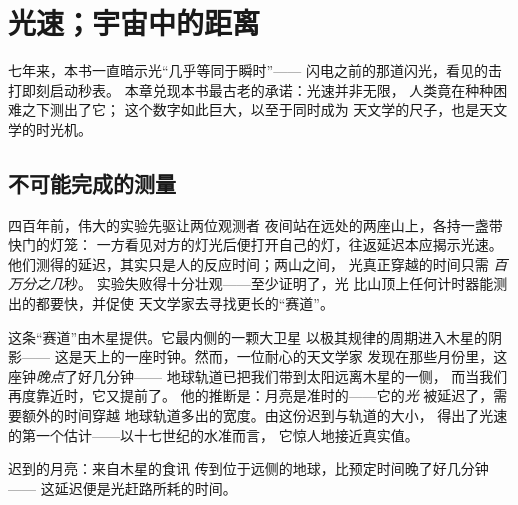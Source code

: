 \chapter{光速；宇宙中的距离}\label{ch:g8:speed-of-light}

七年来，本书一直暗示光“几乎等同于瞬时”——
闪电之前的那道闪光，看见的击打即刻启动秒表。
本章兑现本书最古老的承诺：光速并非无限，
人类竟在种种困难之下测出了它；
这个数字如此巨大，以至于同时成为
天文学的尺子，也是天文学的时光机。

\section{不可能完成的测量}

\begin{example}[两座山上的灯笼]\label{ex:g8:speed-of-light:galileo}
四百年前，伟大的实验先驱让两位观测者
夜间站在远处的两座山上，各持一盏带快门的灯笼：
一方看见对方的灯光后便打开自己的灯，往返延迟本应揭示光速。
他们测得的延迟，其实只是人的反应时间；两山之间，
光真正穿越的时间只需
\emph{百万分之几}秒。
实验失败得十分壮观——至少证明了，光
比山顶上任何计时器能测出的都要快，并促使
天文学家去寻找更长的“赛道”。
\end{example}

\begin{example}[迟到的月亮]\label{ex:g8:speed-of-light:romer}
这条“赛道”由木星提供。它最内侧的一颗大卫星
以极其规律的周期进入木星的阴影——
这是天上的一座时钟。然而，一位耐心的天文学家
发现在那些月份里，这座钟\emph{晚点}了好几分钟——
地球轨道已把我们带到太阳远离木星的一侧，
而当我们再度靠近时，它又提前了。
他的推断是：月亮是准时的——它的\emph{光}
被延迟了，需要额外的时间穿越
地球轨道多出的宽度。由这份迟到与轨道的大小，
得出了光速的第一个估计——以十七世纪的水准而言，
它惊人地接近真实值。
\end{example}

\begin{omfigure}

{\small 迟到的月亮：来自木星的食讯
传到位于远侧的地球，比预定时间晚了好几分钟——
这延迟便是光赶路所耗的时间。}
\end{omfigure}

